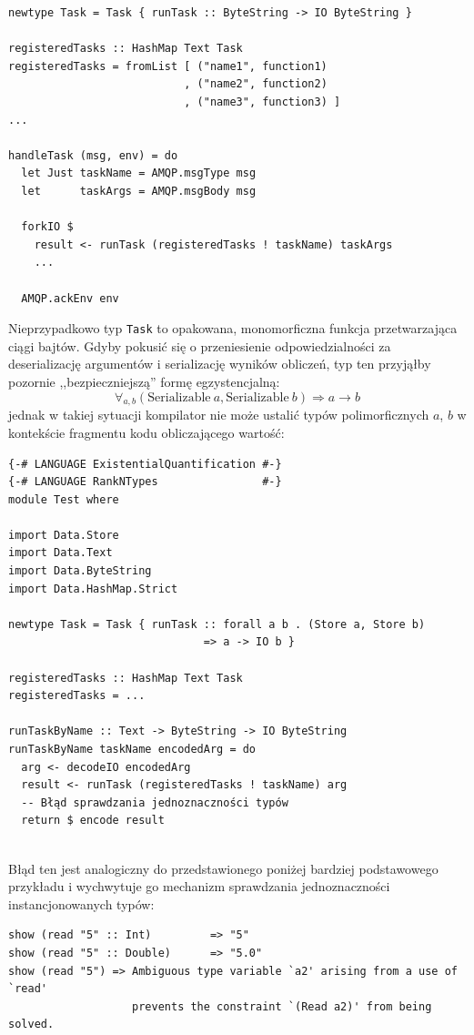\begin{lstlisting}[caption=Schemat obsługi zadania]
newtype Task = Task { runTask :: ByteString -> IO ByteString }

registeredTasks :: HashMap Text Task
registeredTasks = fromList [ ("name1", function1)
                           , ("name2", function2)
                           , ("name3", function3) ]
...

handleTask (msg, env) = do
  let Just taskName = AMQP.msgType msg
  let      taskArgs = AMQP.msgBody msg

  forkIO $
    result <- runTask (registeredTasks ! taskName) taskArgs
    ...
  
  AMQP.ackEnv env
\end{lstlisting}
Nieprzypadkowo typ \lstinline{Task} to opakowana, monomorficzna funkcja przetwarzająca ciągi bajtów. Gdyby pokusić się o przeniesienie odpowiedzialności za deserializację argumentów i serializację wyników obliczeń, typ ten przyjąłby pozornie ,,bezpieczniejszą'' formę egzystencjalną:
{\large $$\forall_{a, b} (\mathrm{Serializable}\ a, \mathrm{Serializable}\ b) \Rightarrow a \rightarrow b$$}%
jednak w takiej sytuacji kompilator nie może ustalić typów polimorficznych $a$, $b$ w kontekście fragmentu kodu obliczającego wartość:
\newpage
\begin{lstlisting}[caption=Problem typu zadania zdefiniowanego egzystencjalnie]
{-# LANGUAGE ExistentialQuantification #-}
{-# LANGUAGE RankNTypes                #-}
module Test where

import Data.Store
import Data.Text
import Data.ByteString
import Data.HashMap.Strict

newtype Task = Task { runTask :: forall a b . (Store a, Store b) 
                              => a -> IO b }

registeredTasks :: HashMap Text Task
registeredTasks = ...

runTaskByName :: Text -> ByteString -> IO ByteString
runTaskByName taskName encodedArg = do
  arg <- decodeIO encodedArg
  result <- runTask (registeredTasks ! taskName) arg
  -- Błąd sprawdzania jednoznaczności typów
  return $ encode result
  
\end{lstlisting}

Błąd ten jest analogiczny do przedstawionego poniżej bardziej podstawowego przykładu i wychwytuje go mechanizm sprawdzania jednoznaczności instancjonowanych typów:
\begin{lstlisting}
show (read "5" :: Int)         => "5"
show (read "5" :: Double)      => "5.0"
show (read "5") => Ambiguous type variable `a2' arising from a use of `read'
                   prevents the constraint `(Read a2)' from being solved.
\end{lstlisting}

